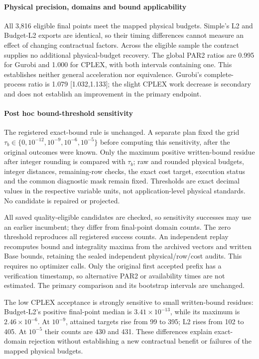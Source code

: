 

\paragraph{Physical precision, domains and bound applicability}
All 3,816 eligible final points meet the mapped physical budgets. Simple's L2
and Budget-L2 exports are identical, so their timing differences cannot measure
an effect of changing contractual factors. Across the eligible sample the
contract supplies no additional physical-budget recovery. The global PAR2
ratios are 0.995 for Gurobi and 1.000 for CPLEX, with both intervals containing
one. This establishes neither general acceleration nor equivalence. Gurobi's
complete-process ratio is 1.079 [1.032,1.133]; the slight CPLEX work decrease
is secondary and does not establish an improvement in the primary endpoint.


\paragraph{Post hoc bound-threshold sensitivity}
The registered exact-bound rule is unchanged. A separate plan fixed the grid
$\tau_b\in\{0,10^{-12},10^{-9},10^{-6},10^{-5}\}$ before computing this
sensitivity, after the original outcomes were known. Only the maximum positive
written-bound residue after integer rounding is compared with $\tau_b$; raw and
rounded physical budgets, integer distances, remaining-row checks, the exact
cost target, execution status and the common diagnostic mask remain fixed.
Thresholds are exact decimal values in the respective variable units, not
application-level physical standards. No candidate is repaired or projected.

All saved quality-eligible candidates are checked, so sensitivity successes may
use an earlier incumbent; they differ from final-point domain counts. The zero
threshold reproduces all registered success counts. An independent replay
recomputes bound and integrality maxima from the archived vectors and written
Base bounds, retaining the sealed independent physical/row/cost audits. This
requires no optimizer calls. Only the original first accepted prefix has a
verification timestamp, so alternative PAR2 or availability times are not
estimated. The primary comparison and its bootstrap intervals are unchanged.


The low CPLEX acceptance is strongly sensitive to small written-bound residues:
Budget-L2's positive final-point median is $3.41\times10^{-13}$, while its
maximum is $2.46\times10^{-6}$. At $10^{-9}$, attained targets rise from 99 to
395; L2 rises from 102 to 405. At $10^{-5}$ their counts are 430 and 431.
These differences explain exact-domain rejection without establishing a new
contractual benefit or failures of the mapped physical budgets.

